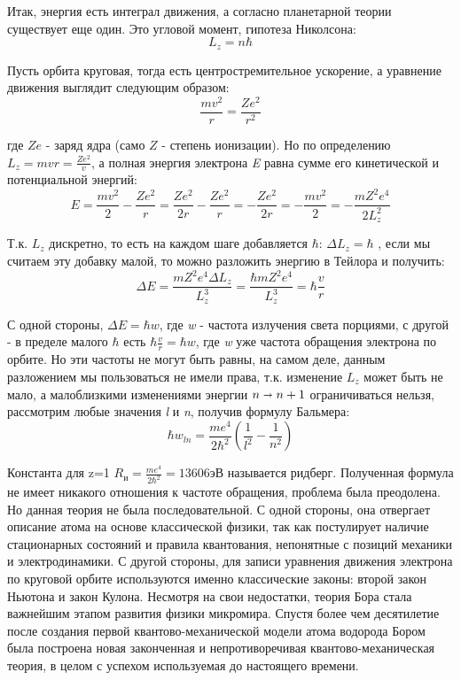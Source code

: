\par Итак, энергия есть интеграл движения, а согласно планетарной теории существует еще один. Это угловой момент, гипотеза Николсона:
$$L_z=n \hbar$$
\par Пусть орбита круговая, тогда есть центростремительное ускорение, а уравнение движения выглядит следующим образом:
$$\frac{m \textit{v}^2}{r} = \frac{Z e^2}{r^2} $$
\par где $Z e$ - заряд ядра (само $Z$ - степень ионизации). Но по определению $L_z=m \textit{v} r=\frac{Z e^2}{\textit{v}}$, а полная энергия электрона \textit{E} равна сумме его кинетической и потенциальной энергий:
$$ E=\frac{m \textit{v}^2}{2}-\frac{Z e^2}{r} = \frac{Z e^2}{2r} - \frac{Z e^2}{r} = -\frac{Z e^2}{2r}=  -\frac{m \textit{v}^2}{2} = - \frac{m Z^2 e^4}{2L_z^2} $$
\par Т.к. $L_z$ дискретно, то есть на каждом шаге добавляется $\hbar$:  $ \Delta L_z = \hbar $ ,  если мы считаем эту добавку малой, то можно разложить энергию в Тейлора и получить:
$$\Delta E = \frac{m Z^2 e^4 \Delta L_z}{L_z^3} = \frac{\hbar m Z^2 e^4}{L_z^3}=\hbar \frac{\textit{v}}{r} $$
\par С одной стороны, $\Delta E = \hbar w$, где \textit{w} - частота излучения света порциями, с другой - в пределе малого $\hbar$ есть $\hbar \frac{\textit{v}}{r} = \hbar w$, где \textit{w} уже частота обращения электрона по орбите. Но эти частоты не могут быть равны, на самом деле, данным разложением мы пользоваться не имели права, т.к. изменение $ L_z $ может быть не мало, а малоблизкими изменениями энергии $n \shortrightarrow n+1$ ограничиваться нельзя, рассмотрим любые значения \textit{l} и \textit{n}, получив формулу Бальмера:
$$\hbar w_{l n}=\frac{m e^4}{2 \hbar^2} (\frac{1}{l^2}-\frac{1}{n^2}) $$
\par Константа для z=1 $R_и=\frac{m e^4}{2 \hbar^2}=13606 эВ$ называется ридберг. Полученная формула не имеет никакого отношения к частоте обращения, проблема была преодолена. Но данная теория не была последовательной. С одной стороны, она отвергает описание атома на основе классической физики, так как постулирует наличие стационарных состояний и правила квантования, непонятные с позиций механики и электродинамики. С другой стороны, для записи уравнения движения электрона по круговой орбите используются именно классические законы: второй закон Ньютона и закон Кулона. Несмотря на свои недостатки, теория Бора стала важнейшим этапом развития физики микромира. Спустя более чем десятилетие после создания первой квантово-механической модели атома водорода Бором была построена новая законченная и непротиворечивая квантово-механическая теория, в целом с успехом используемая до настоящего времени.